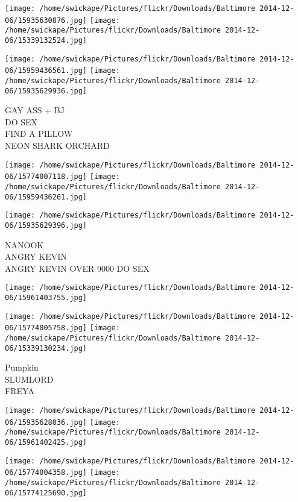 \documentclass[10pt,letterpaper]{article}
\begin{document}
\texttt{[image: /home/swickape/Pictures/flickr/Downloads/Baltimore 2014-12-06/15935630876.jpg]}
\texttt{[image: /home/swickape/Pictures/flickr/Downloads/Baltimore 2014-12-06/15339132524.jpg]}

\texttt{[image: /home/swickape/Pictures/flickr/Downloads/Baltimore 2014-12-06/15959436561.jpg]}
\texttt{[image: /home/swickape/Pictures/flickr/Downloads/Baltimore 2014-12-06/15935629936.jpg]}

GAY ASS + BJ\\
DO SEX\\
FIND A PILLOW\\
NEON SHARK ORCHARD\\
\pagebreak

\texttt{[image: /home/swickape/Pictures/flickr/Downloads/Baltimore 2014-12-06/15774007118.jpg]}
\texttt{[image: /home/swickape/Pictures/flickr/Downloads/Baltimore 2014-12-06/15959436261.jpg]}

\texttt{[image: /home/swickape/Pictures/flickr/Downloads/Baltimore 2014-12-06/15935629396.jpg]}

NANOOK\\
ANGRY KEVIN\\
ANGRY KEVIN OVER 9000 DO SEX\\
\pagebreak

\texttt{[image: /home/swickape/Pictures/flickr/Downloads/Baltimore 2014-12-06/15961403755.jpg]}

\vspace{0.25in}
\texttt{[image: /home/swickape/Pictures/flickr/Downloads/Baltimore 2014-12-06/15774005758.jpg]}
\texttt{[image: /home/swickape/Pictures/flickr/Downloads/Baltimore 2014-12-06/15339130234.jpg]}

Pumpkin\\
SLUMLORD\\
FREYA\\
\pagebreak

\texttt{[image: /home/swickape/Pictures/flickr/Downloads/Baltimore 2014-12-06/15935628036.jpg]}
\texttt{[image: /home/swickape/Pictures/flickr/Downloads/Baltimore 2014-12-06/15961402425.jpg]}

\texttt{[image: /home/swickape/Pictures/flickr/Downloads/Baltimore 2014-12-06/15774004358.jpg]}
\texttt{[image: /home/swickape/Pictures/flickr/Downloads/Baltimore 2014-12-06/15774125690.jpg]}
\end{document}
